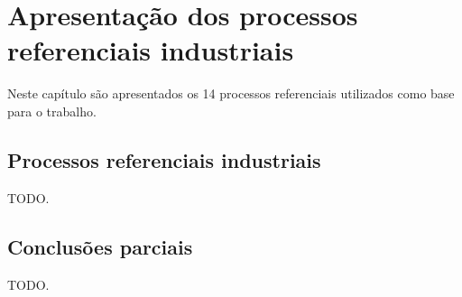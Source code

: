 \chapter{Apresentação dos processos referenciais industriais
    \label{cap:processos-referenciais}}

\vfill{}

Neste capítulo são apresentados os 14 processos referenciais utilizados
como base para o trabalho.

\newpage

\section{Processos referenciais industriais}

    TODO.

\section{Conclusões parciais}

    TODO.
